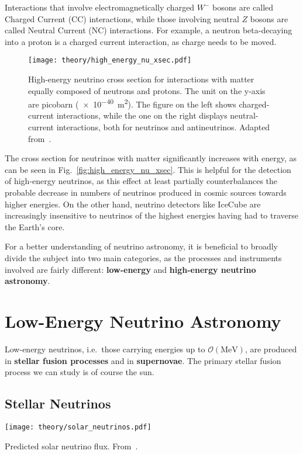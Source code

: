 Interactions that involve electromagnetically charged $W^-$ bosons are called Charged Current (CC) interactions, while those involving neutral $Z$ bosons are called Neutral Current (NC) interactions. For example, a neutron beta-decaying into a proton is a charged current interaction, as charge needs to be moved.

\begin{figure}[htb]
    \texttt{[image: theory/high\_energy\_nu\_xsec.pdf]}
    \caption[High-energy neutrino cross section]{High-energy neutrino cross section for interactions with matter equally composed of neutrons and protons. The unit on the y-axis are picobarn (\SI{e-40}{\m\squared}). The figure on the left shows charged-current interactions, while the one on the right displays neutral-current interactions, both for neutrinos and antineutrinos. Adapted from~\cite{CooperSarkar2011}.}
\end{figure}

The cross section for neutrinos with matter significantly increases with energy, as can be seen in Fig.~\ref{fig:high_energy_nu_xsec}. This is helpful for the detection of high-energy neutrinos, as this effect at least partially counterbalances the probable decrease in numbers of neutrinos produced in cosmic sources towards higher energies. On the other hand, neutrino detectors like IceCube are increasingly insensitive to neutrinos of the highest energies having had to traverse the Earth's core.

For a better understanding of neutrino astronomy, it is beneficial to broadly divide the subject into two main categories, as the processes and instruments involved are fairly different: \textbf{low-energy} and \textbf{high-energy neutrino astronomy}.

\section{Low-Energy Neutrino Astronomy}
Low-energy neutrinos, i.e.\ those carrying energies up to $\mathcal{O}(\unit{\mega\eV})$, are produced in \textbf{stellar fusion processes} and in \textbf{supernovae}. The primary stellar fusion process we can study is of course the sun.

\subsection{Stellar Neutrinos}
\begin{marginfigure}
    \texttt{[image: theory/solar\_neutrinos.pdf]}
    \caption[Predicted solar neutrino flux]{Predicted solar neutrino flux. From~\cite{Agostini2018}.}
\end{marginfigure}


